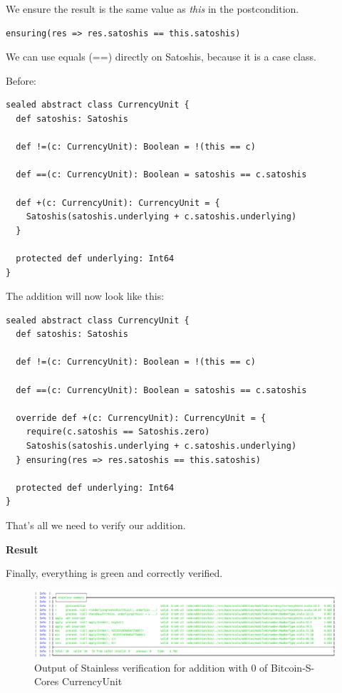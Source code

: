 \documentclass[runningheads]{llncs}
\renewcommand{\paragraph}{\textbf}%
\begin{document}
We ensure the result is the same value as \emph{this} in the postcondition.
\begin{lstlisting}[style=scala]
  ensuring(res => res.satoshis == this.satoshis)
\end{lstlisting}

We can use equals (==) directly on Satoshis, because it is a case class.

Before:
\begin{lstlisting}[style=scala]
sealed abstract class CurrencyUnit {
  def satoshis: Satoshis

  def !=(c: CurrencyUnit): Boolean = !(this == c)

  def ==(c: CurrencyUnit): Boolean = satoshis == c.satoshis

  def +(c: CurrencyUnit): CurrencyUnit = {
    Satoshis(satoshis.underlying + c.satoshis.underlying)
  }

  protected def underlying: Int64
}
\end{lstlisting}

The addition will now look like this:
\begin{lstlisting}[style=scala]
sealed abstract class CurrencyUnit {
  def satoshis: Satoshis

  def !=(c: CurrencyUnit): Boolean = !(this == c)

  def ==(c: CurrencyUnit): Boolean = satoshis == c.satoshis
  
  override def +(c: CurrencyUnit): CurrencyUnit = {
    require(c.satoshis == Satoshis.zero)
    Satoshis(satoshis.underlying + c.satoshis.underlying)
  } ensuring(res => res.satoshis == this.satoshis)

  protected def underlying: Int64
}
\end{lstlisting}

That's all we need to verify our addition.



\paragraph{Result}

Finally, everything is green and correctly verified. 
\begin{figure}
	\centering
		\includegraphics[width=\textwidth]{result_output}
	\caption{Output of Stainless verification for addition with 0 of Bitcoin-S-Cores CurrencyUnit}
\end{figure}
\end{document}

